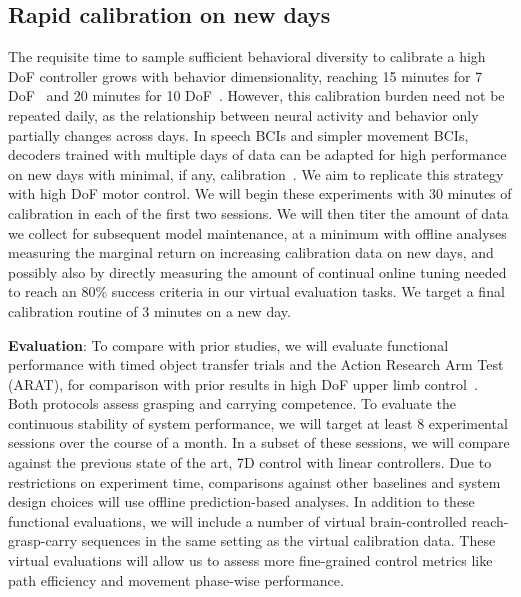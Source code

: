 \documentclass[12pt,oneside]{report}
\begin{document}

\subsection{Rapid calibration on new days}
The requisite time to sample sufficient behavioral diversity to calibrate a high DoF controller grows with behavior dimensionality, reaching 15 minutes for 7 DoF~\citep{collinger2013high} and 20 minutes for 10 DoF~\citep{wodlinger_15_10d}. However, this calibration burden need not be repeated daily, as the relationship between neural activity and behavior only partially changes across days. In speech BCIs and simpler movement BCIs, decoders trained with multiple days of data can be adapted for high performance on new days with minimal, if any, calibration~\citep{sussillo_16_future,hosman2023months,fan2023plugandplay,card2025long}. We aim to replicate this strategy with high DoF motor control.
We will begin these experiments with 30 minutes of calibration in each of the first two sessions.
We will then titer the amount of data we collect for subsequent model maintenance, at a minimum with offline analyses measuring the marginal return on increasing calibration data on new days, and possibly also by directly measuring the amount of continual online tuning needed to reach an 80\% success criteria in our virtual evaluation tasks. We target a final calibration routine of 3 minutes on a new day.

\textbf{Evaluation}: To compare with prior studies, we will evaluate functional performance with timed object transfer trials and the Action Research Arm Test (ARAT), for comparison with prior results in high DoF upper limb control~\citep{collinger2013high,wodlinger_15_10d}. Both protocols assess grasping and carrying competence. To evaluate the continuous stability of system performance, we will target at least 8 experimental sessions over the course of a month. In a subset of these sessions, we will compare against the previous state of the art, 7D control with linear controllers. Due to restrictions on experiment time, comparisons against other baselines and system design choices will use offline prediction-based analyses. In addition to these functional evaluations, we will include a number of virtual brain-controlled reach-grasp-carry sequences in the same setting as the virtual calibration data. These virtual evaluations will allow us to assess more fine-grained control metrics like path efficiency and movement phase-wise performance.
\end{document}
